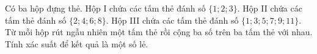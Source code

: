 \begin{bt}%
	Có ba hộp đựng thẻ. Hộp I chứa các tấm thẻ đánh số $\{1 ; 2 ; 3\}$. Hộp II chứa các tấm thẻ đánh số $\{2 ; 4 ; 6 ; 8\}$. Hộp III chứa các tấm thẻ đánh số $\{1 ; 3 ; 5 ; 7; 9 ; 11\}$. Từ mỗi hộp rút ngẫu nhiên một tấm thẻ rồi cộng ba số trên ba tấm thẻ với nhau. Tính xác suất để kết quả là một số lẻ.
\end{bt}


